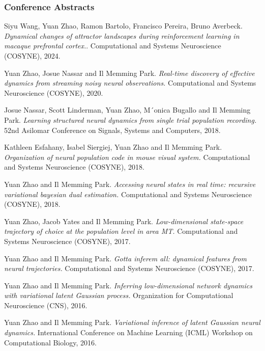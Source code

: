 \documentclass[11pt]{article}
\begin{document}
\subsubsection*{Conference Abstracts}
\begin{enumerate}[label={[\arabic*]}]
    \item Siyu Wang, Yuan Zhao, Ramon Bartolo, Francisco Pereira, Bruno Averbeck. \textit{Dynamical changes of attractor landscapes during reinforcement learning in macaque prefrontal
cortex.}. Computational and Systems Neuroscience (COSYNE), 2024.
    \item Yuan Zhao, Josue Nassar and Il Memming Park. \textit{Real-time discovery of effective dynamics from streaming noisy neural observations.} Computational and Systems Neuroscience (COSYNE), 2020.
    \item Josue Nassar, Scott Linderman, Yuan Zhao, M´onica Bugallo and Il Memming Park. \textit{Learning structured neural dynamics from single trial population recording.} 52nd Asilomar Conference on Signals, Systems and Computers, 2018.
    \item Kathleen Esfahany, Isabel Siergiej, Yuan Zhao and Il Memming Park. \textit{Organization of neural population code in mouse visual system.} Computational and Systems Neuroscience (COSYNE), 2018.
    \item Yuan Zhao and Il Memming Park. \textit{Accessing neural states in real time: recursive variational bayesian dual estimation.} Computational and Systems Neuroscience (COSYNE), 2018.
    \item Yuan Zhao, Jacob Yates and Il Memming Park. \textit{Low-dimensional state-space trajectory of choice at the population level in area MT.} Computational and Systems Neuroscience (COSYNE), 2017.
    \item Yuan Zhao and Il Memming Park. \textit{Gotta inferem all: dynamical features from neural trajectories.} Computational and Systems Neuroscience (COSYNE), 2017.
    \item Yuan Zhao and Il Memming Park. \textit{Inferring low-dimensional network dynamics with variational latent Gaussian process.} Organization for Computational Neuroscience (CNS), 2016.
    \item Yuan Zhao and Il Memming Park. \textit{Variational inference of latent Gaussian neural dynamics.} 
    International Conference on Machine Learning (ICML) Workshop on Computational Biology, 2016.
\end{enumerate}
\end{document}
